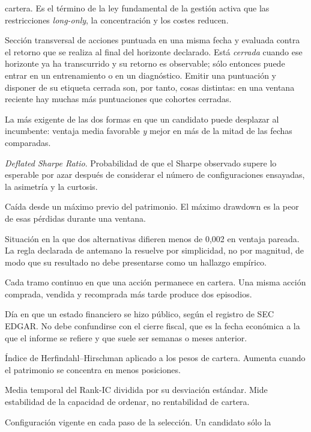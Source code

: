 \begin{description}[leftmargin=3.2cm,style=nextline,itemsep=0.45em]
  cartera. Es el término de la ley fundamental de la gestión activa que las restricciones
  \textit{long-only}, la concentración y los costes reducen.
  \item[Cohorte] Sección transversal de acciones puntuada en una misma fecha y evaluada contra el
  retorno que se realiza al final del horizonte declarado. Está \emph{cerrada} cuando ese horizonte
  ya ha transcurrido y su retorno es observable; sólo entonces puede entrar en un entrenamiento o en
  un diagnóstico. Emitir una puntuación y disponer de su etiqueta cerrada son, por tanto, cosas
  distintas: en una ventana reciente hay muchas más puntuaciones que cohortes cerradas.
  \item[Dominancia] La más exigente de las dos formas en que un candidato puede desplazar al
  incumbente: ventaja media favorable \emph{y} mejor en más de la mitad de las fechas comparadas.
  \item[DSR] \textit{Deflated Sharpe Ratio}. Probabilidad de que el Sharpe observado supere lo
  esperable por azar después de considerar el número de configuraciones ensayadas, la asimetría y la
  curtosis.
  \item[Drawdown] Caída desde un máximo previo del patrimonio. El máximo drawdown es la peor de esas
  pérdidas durante una ventana.
  \item[Empate técnico] Situación en la que dos alternativas difieren menos de 0,002 en ventaja
  pareada. La regla declarada de antemano la resuelve por simplicidad, no por magnitud, de modo que
  su resultado no debe presentarse como un hallazgo empírico.
  \item[Episodio de tenencia] Cada tramo continuo en que una acción permanece en cartera. Una misma
  acción comprada, vendida y recomprada más tarde produce dos episodios.
  \item[Fecha de publicación] Día en que un estado financiero se hizo público, según el registro de
  SEC EDGAR. No debe confundirse con el cierre fiscal, que es la fecha económica a la que el informe
  se refiere y que suele ser semanas o meses anterior.
  \item[HHI] Índice de Herfindahl--Hirschman aplicado a los pesos de cartera. Aumenta cuando el
  patrimonio se concentra en menos posiciones.
  \item[IC-IR] Media temporal del Rank-IC dividida por su desviación estándar. Mide estabilidad de
  la capacidad de ordenar, no rentabilidad de cartera.
  \item[Incumbente] Configuración vigente en cada paso de la selección. Un candidato sólo la

\end{description}
